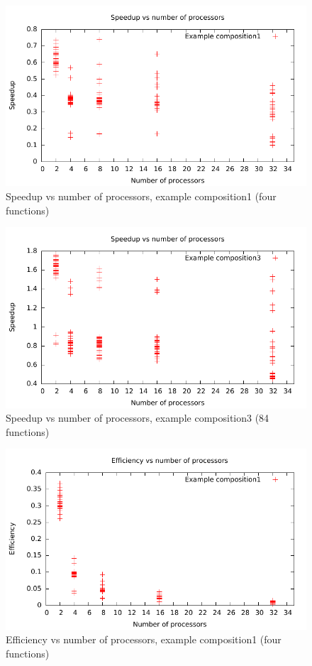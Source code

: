 \documentclass{acm_proc_article-sp}
\begin{document}
\begin{figure}[ht] 
	\centering
	\includegraphics[scale=0.6]{../../data/composition1s.pdf}
	\caption{Speedup vs number of processors, example composition1 (four
	functions)} 
	\label{fig:c1s} 
\end{figure} 

\begin{figure}[ht] 
	\centering
	\includegraphics[scale=0.6]{../../data/composition3s.pdf}
	\caption{Speedup vs number of processors, example composition3 (84
	functions)} 
	\label{fig:c3s} 
\end{figure} 

\begin{figure}[ht] 
	\centering
	\includegraphics[scale=0.6]{../../data/composition1e.pdf}
	\caption{Efficiency vs number of processors, example composition1 (four
	functions)} 
	\label{fig:c1e}
\end{figure} 
\end{document}
